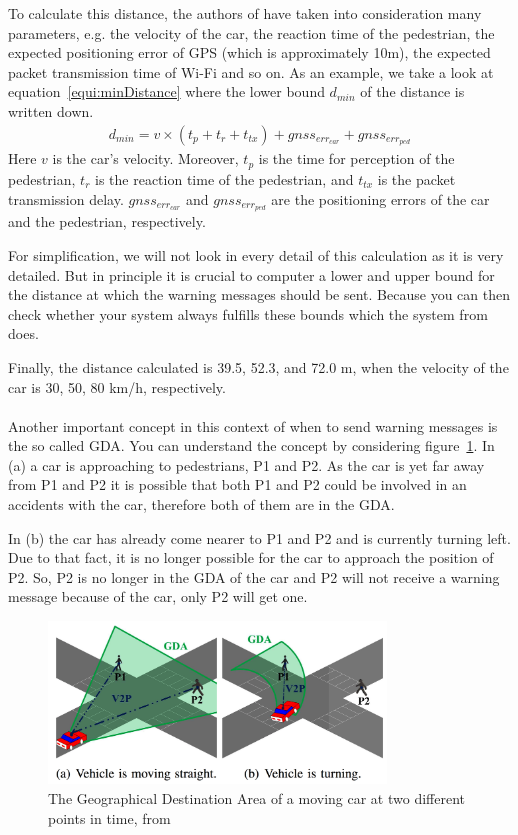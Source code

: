 \documentclass[]{ccs-thesis}
\begin{document}
To calculate this distance, the authors of \cite{v2pcomm} have taken into consideration many parameters, e.g. the velocity of the car, the reaction time of the pedestrian, the expected positioning error of GPS (which is approximately 10m), the expected packet transmission time of Wi-Fi and so on. As an example, we take a look at equation~\ref{equi:minDistance} where the lower bound $d_{min}$ of the distance is written down.
\begin{align}
d_{min}=v \times (t_p+t_r+t_{tx})+gnss_{err_{car}}+gnss_{err_{ped}}\label{equi:minDistance}
\end{align}
Here $v$ is the car's velocity. Moreover, $t_p$ is the time for perception of the pedestrian, $t_r$ is the reaction time of the pedestrian, and $t_{tx}$ is the packet transmission delay. $gnss_{err_{car}}$ and $gnss_{err_{ped}}$ are the positioning errors of the car and the pedestrian, respectively.

For simplification, we will not look in every detail of this calculation as it is very detailed. But in principle it is crucial to computer a lower and upper bound for the distance at which the warning messages should be sent. Because you can then check whether your system always fulfills these bounds which the system from \cite{v2pcomm} does.

Finally, the distance calculated is 39.5, 52.3, and 72.0 m, when the velocity of the car is 30, 50, 80 km/h, respectively.
\\\\
Another important concept in this context of when to send warning messages is the so called \ac{GDA}. You can understand the concept by considering figure~\ref{fig:gda}. In (a) a car is approaching to pedestrians, P1 and P2. As the car is yet far away from P1 and P2 it is possible that both P1 and P2 could be involved in an accidents with the car, therefore both of them are in the \ac{GDA}.

In (b) the car has already come nearer to P1 and P2 and is currently turning left. Due to that fact, it is no longer possible for the car to approach the position of P2. So, P2 is no longer in the \ac{GDA} of the car and P2 will not receive a warning message because of the car, only P2 will get one.

\begin{figure}[h]
	\centering
	\includegraphics[width=0.8\textwidth]{figures/5_gda}
	\caption{The Geographical Destination Area of a moving car at two different points in time, from \cite{v2pcomm}}%
	\label{fig:gda}%
\end{figure}
\end{document}

